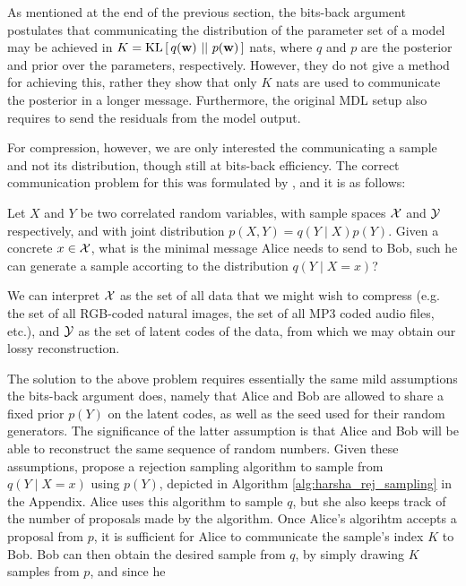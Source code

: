 \par
As mentioned at the end of the previous section, the bits-back argument
postulates that communicating the distribution of the parameter set of a model
may be achieved in $K = \mathrm{KL}\left[\,q(\mathbf{w})\,\,||\,\,p(\mathbf{w})\,\right]$ nats, where $q$ and $p$ are the
posterior and prior over the parameters, respectively. However, they do not give
a method for achieving this, rather they show that only $K$ nats are used to
communicate the posterior in a longer message. Furthermore, the original MDL setup
also requires to send the residuals from the model output.
\par
For compression, however, we are only interested the communicating a sample and
not its distribution, though still at bits-back efficiency. 
The correct communication problem for this was formulated by
\cite{harsha2007communication}, and it is as
follows:
\begin{framed}
Let $X$ and $Y$ be two correlated random variables, with sample spaces
$\mathcal{X}$ and $\mathcal{Y}$ respectively, and with joint distribution $p(X, Y) = q(Y \mid
X)p(Y)$. Given a concrete $x \in \mathcal{X}$, what is the minimal
message Alice needs to send to Bob, such he can generate a sample accorting to
the distribution $q(Y \mid X = x)$?
\end{framed}
\par 
We can interpret $\mathcal{X}$ as the set of all data that we might wish to compress
(e.g. the set of all RGB-coded natural images, the set of all MP3 coded audio
files, etc.), and $\mathcal{Y}$ as the set of latent codes of the data, from which we may
obtain our lossy reconstruction. 
\par
The solution to the above problem requires essentially the same mild assumptions
the bits-back argument does, namely that Alice and Bob are allowed to
share a fixed prior $p(Y)$ on the latent codes, as well as the seed used for
their random generators. The significance of the latter assumption is that Alice
and Bob will be able to reconstruct the same sequence of random numbers. Given
these assumptions, \cite{harsha2007communication} propose a rejection sampling
algorithm to sample from $q(Y \mid X = x)$ using $p(Y)$, depicted in Algorithm
\ref{alg:harsha_rej_sampling} in the Appendix. Alice uses this algorithm to
sample $q$, but she also keeps track of the number of proposals made by the
algorithm. Once Alice's algorihtm accepts a proposal from $p$, it is sufficient
for Alice to communicate the sample's index $K$ to Bob. Bob can then obtain the
desired sample from $q$, by simply drawing $K$ samples from $p$, and since he
